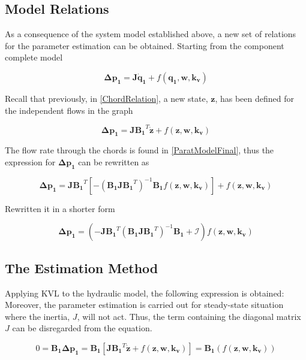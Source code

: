 \subsection{Model Relations}
\label{ModelRelationSection}

As a consequence of the system model established above, a new set of relations for the parameter estimation can be 
obtained. Starting from the component complete model

\begin{equation}
  \pmb{\Delta p_1} =  \pmb{J} \pmb{\dot{q}_1} + f(\pmb{q_1}, \pmb{w}, \pmb{k_v})
  \label{RecallModel}
\end{equation}

Recall that previously, in \eqref{ChordRelation}, a new state, $\pmb{z}$, has been defined for the independent flows in 
the graph

\begin{equation}
  \pmb{\Delta p_1} =  \pmb{J {B_1}}^T \pmb{\dot{z}} + f(\pmb{z}, \pmb{w}, \pmb{k_v})
 \end{equation}

The flow rate through the chords is found in \eqref{ParatModelFinal}, thus the expression for $ \pmb{\Delta p_1} $ can be rewritten as

\begin{equation}
 \pmb{ \Delta p_1} = \pmb{ J {B_1}}^T [- (\pmb{B_1 J {B_1}}^T)^{-1}\pmb{B_1} f(\pmb{z},\pmb{ w}, \pmb{k_v})] + f(\pmb{z},\pmb{ w}, \pmb{k_v})
  \label{PressureLarge}
 \end{equation}
 
 Rewritten it in a shorter form
 
 \begin{equation}
  \pmb{\Delta p_1} =  (-\pmb{J {B_1}}^T (\pmb{B_1 J {B_1}}^T)^{-1}\pmb{B_1} + \pmb{\mathcal{I}}) f(\pmb{z}, \pmb{w}, \pmb{k_v})
  \label{PressureShort}
 \end{equation}

\subsection{The Estimation Method}
\label{SubSecEstimation}

Applying KVL to the hydraulic model, the following expression is obtained: Moreover, the parameter estimation is carried out for steady-state 
situation where the inertia, $J$, will not act. Thus, the term containing the diagonal matrix $J$ can be disregarded from the equation. 

\begin{equation}
  0 = \pmb{B_1 \Delta p_1 }= \pmb{B_1} [ \pmb{J {B_1}}^T \pmb{\dot{z}} + f(\pmb{z},\pmb{ w}, \pmb{k_v})]  = \pmb{ B_1} (f(\pmb{z}, \pmb{w},\pmb{ k_v}))
  \label{esteq}
 \end{equation}
 
